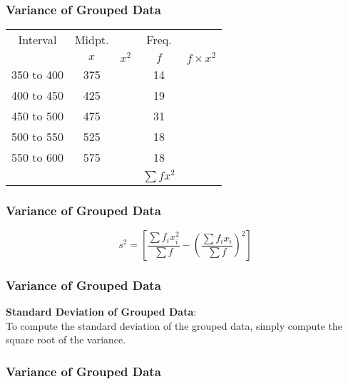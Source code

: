 \documentclass[slidemain.tex]{subfiles}
\begin{document}
\begin{frame}
\frametitle{Variance of Grouped Data}
{
\begin{center}
\Large

\begin{tabular}{|c|c|c|c|c|}
\hline Interval & Midpt. & \phantom{spacespa}  & Freq. &  \\ 
& $x$& $x^2$ & $f$ &  \phantom{sp}$f \times x^2$ \phantom{sp}\\ 
\hline \hline 350 to 400 & 375  & & 14&  \\ 
\hline 400 to 450 & 425 & &   19& \\ 
\hline 450 to 500 & 475 & &   31&\\ 
\hline 500 to 550 & 525 & &   18&\\ 
\hline 550 to 600 & 575 & &   18&\\ \hline

\hline &  & &   $\sum f x^2$ &\\ \hline
\hline 
\end{tabular} 
\end{center}
}

\end{frame}

\begin{frame}
\frametitle{Variance of Grouped Data}
{
\LARGE
\vspace{-2.6cm}
\[ s^2 = \left[ \frac{\sum f_ix_i^2}{\sum f} - \left(\frac{\sum f_ix_i}{\sum f}\right)^2 \right] \]
\bigskip


}

\end{frame}
\begin{frame}
\frametitle{Variance of Grouped Data}
\LARGE
\vspace{-1.5cm}
\textbf{Standard Deviation of Grouped Data}:\\
To compute the standard deviation of the grouped data, simply compute the square root of the variance.

\end{frame}
\begin{frame}
\frametitle{Variance of Grouped Data}
\end{frame}
\end{document}
